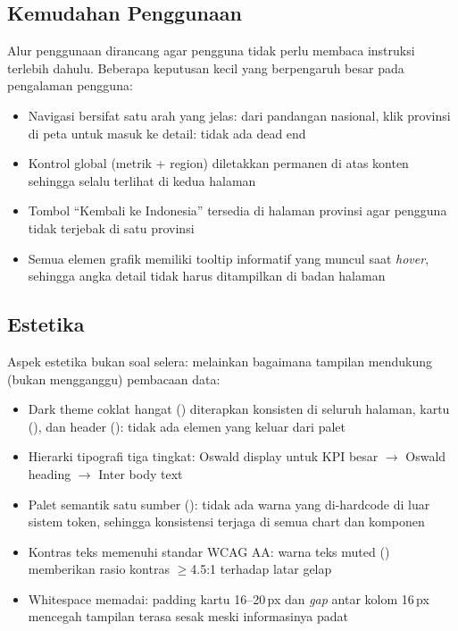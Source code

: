 \subsection{Kemudahan Penggunaan}

Alur penggunaan dirancang agar pengguna tidak perlu membaca instruksi terlebih dahulu. Beberapa keputusan kecil yang berpengaruh besar pada pengalaman pengguna:

\begin{itemize}
  \item Navigasi bersifat satu arah yang jelas: dari pandangan nasional, klik provinsi di peta untuk masuk ke detail: tidak ada dead end
  \item Kontrol global (metrik + region) diletakkan permanen di atas konten sehingga selalu terlihat di kedua halaman
  \item Tombol ``Kembali ke Indonesia'' tersedia di halaman provinsi agar pengguna tidak terjebak di satu provinsi
  \item Semua elemen grafik memiliki tooltip informatif yang muncul saat \textit{hover}, sehingga angka detail tidak harus ditampilkan di badan halaman
\end{itemize}

\subsection{Estetika}

Aspek estetika bukan soal selera: melainkan bagaimana tampilan mendukung (bukan mengganggu) pembacaan data:

\begin{itemize}
  \item Dark theme coklat hangat () diterapkan konsisten di seluruh halaman, kartu (), dan header (): tidak ada elemen yang keluar dari palet
  \item Hierarki tipografi tiga tingkat: Oswald display untuk KPI besar $\to$ Oswald heading $\to$ Inter body text
  \item Palet semantik satu sumber (): tidak ada warna yang di-hardcode di luar sistem token, sehingga konsistensi terjaga di semua chart dan komponen
  \item Kontras teks memenuhi standar WCAG AA: warna teks muted () memberikan rasio kontras $\geq$4.5:1 terhadap latar gelap
  \item Whitespace memadai: padding kartu 16--20\,px dan \textit{gap} antar kolom 16\,px mencegah tampilan terasa sesak meski informasinya padat
\end{itemize}
